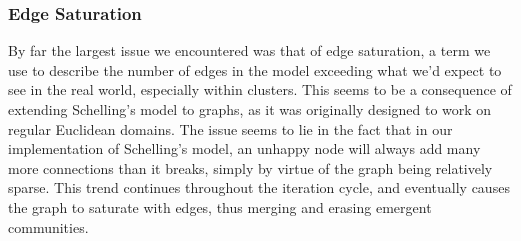 \documentclass[12pt,twoside]{report}
\begin{document}
\subsubsection{Edge Saturation}

By far the largest issue we encountered was that of edge saturation, a term we use to describe the number of edges in the model exceeding what we'd expect to see in the real world, especially within clusters. This seems to be a consequence of extending Schelling's model to graphs, as it was originally designed to work on regular Euclidean domains. The issue seems to lie in the fact that in our implementation of Schelling's model, an unhappy node will always add many more connections than it breaks, simply by virtue of the graph being relatively sparse. This trend continues throughout the iteration cycle, and eventually causes the graph to saturate with edges, thus merging and erasing emergent communities. \\
\end{document}
